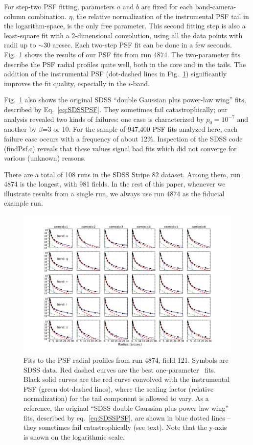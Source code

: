 For step-two PSF fitting, parameters $a$ and $b$ are
fixed for each band-camera-column combination.
$\eta$, the relative normalization of the instrumental PSF
tail in the logarithm-space, is the only free
parameter.
This second fitting step is also a least-square fit with a
2-dimensional convolution, using all the data points
with radii up to $\sim$30 arcsec.
Each two-step PSF fit can be done in a few seconds.
Fig.~\ref{fig:psffit} shows the results of our PSF fits from run 4874. The two-parameter
fits describe the PSF radial profiles quite well, both in the core and
in the tails. The addition of the instrumental PSF 
(dot-dashed lines in Fig.~\ref{fig:psffit})
significantly improves the fit quality, 
especially in the $i$-band. 

Fig.~\ref{fig:psffit} also shows the original SDSS ``double Gaussian plus power-law wing'' fits,
described by Eq.~\ref{eq:SDSSPSF}. They sometimes fail catastrophically; our analysis revealed
two kinds of failures: one case is characterized by $p_0 =10^{-7}$ and
another by $\beta$=3 or 10.
For the sample of 947,400 PSF fits analyzed here, each failure case occurs with a frequency of about 12\%. 
Inspection of the SDSS code (findPsf.c) reveals that these values signal bad fits which did not 
converge for various (unknown) reasons. 

There are a total of 108 runs in the SDSS Stripe 82 dataset. Among them, run 4874 is the longest, 
with 981 fields. In the rest of this paper, whenever we illustrate results from a single run, 
we always use run 4874 as the fiducial example run. 


\begin{figure}[th]
\centering
\includegraphics[width=1.0\textwidth]{FIGURES/psffit.png}
\vskip -0.3in
\caption{Fits to the PSF radial profiles from run 4874, field 121. Symbols are SDSS data. 
  Red dashed curves are the best one-parameter \vk~fits. Black solid curves are the red
  curve convolved with the instrumental PSF (green dot-dashed lines), where the scaling factor
  (relative normalization) 
  for the tail component is allowed to vary. 
As a reference, the original ``SDSS double Gaussian plus power-law wing'' fits,
described by eq.~\ref{eq:SDSSPSF}, 
 are shown in blue dotted lines -- they sometimes fail catastrophically (see text). 
Note that the y-axis is shown on the logarithmic scale.
\label{fig:psffit}}
\end{figure}


